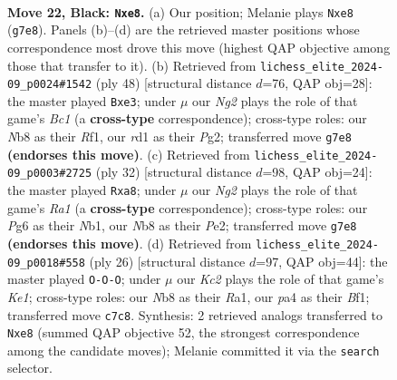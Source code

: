 \documentclass[11pt]{article}
\begin{document}
\clearpage

\begin{figure}[p]\centering
\begin{subfigure}{0.46\textwidth}\centering
\resizebox{\linewidth}{!}{%
\newchessgame
\chessboard[
  setfen={rn2Bbr1/1pk3np/4p1p1/p1P3B1/P3P3/2N5/1P3RPP/3RN1K1 b - - 0 22},
  showmover=false,
  pgfstyle=straightmove, color=movearrow, markmove={g7-e8}
]}
\caption{}
\end{subfigure}\hfill
\begin{subfigure}{0.46\textwidth}\centering
\resizebox{\linewidth}{!}{%
\newchessgame
\chessboard[
  setfen={4r3/p1pk2pp/8/3r1p1n/2p2p2/2P1bN1N/PP4PP/R1B2R1K w - - 6 25},
  showmover=false,
  pgfstyle=straightmove, color=movearrow, markmove={c1-e3}
]}
\caption{}
\end{subfigure}
\\[4pt]
\begin{subfigure}{0.46\textwidth}\centering
\resizebox{\linewidth}{!}{%
\newchessgame
\chessboard[
  setfen={q4rk1/1p3ppp/2n1bn2/8/1p1p4/3P1NPP/4PPB1/RN3RK1 w - - 0 17},
  showmover=false,
  pgfstyle=straightmove, color=movearrow, markmove={a1-a8}
]}
\caption{}
\end{subfigure}\hfill
\begin{subfigure}{0.46\textwidth}\centering
\resizebox{\linewidth}{!}{%
\newchessgame
\chessboard[
  setfen={r2r2k1/pp3p1p/2nNbp2/4p3/4P3/2P5/PP3PPP/R3KB1R w KQ - 1 14},
  showmover=false,
  pgfstyle=straightmove, color=movearrow, markmove={e1-c1}
]}
\caption{}
\end{subfigure}
\caption{\textbf{Move 22, Black: \texttt{Nxe8}.} (a) Our position; Melanie plays \texttt{Nxe8} (\texttt{g7e8}). Panels (b)--(d) are the retrieved master positions whose correspondence most drove this move (highest QAP objective among those that transfer to it). (b) Retrieved from \texttt{lichess\_elite\_2024-09\_p0024\#1542} (ply 48) [structural distance $d$=76, QAP obj=28]: the master played \texttt{Bxe3}; under $\mu$ our \emph{Ng2} plays the role of that game's \emph{Bc1} (a \textbf{cross-type} correspondence); cross-type roles: our \emph{N}b8 as their \emph{R}f1, our \emph{r}d1 as their \emph{P}g2; transferred move \texttt{g7e8} \textbf{(endorses this move)}. (c) Retrieved from \texttt{lichess\_elite\_2024-09\_p0003\#2725} (ply 32) [structural distance $d$=98, QAP obj=24]: the master played \texttt{Rxa8}; under $\mu$ our \emph{Ng2} plays the role of that game's \emph{Ra1} (a \textbf{cross-type} correspondence); cross-type roles: our \emph{P}g6 as their \emph{N}b1, our \emph{N}b8 as their \emph{P}e2; transferred move \texttt{g7e8} \textbf{(endorses this move)}. (d) Retrieved from \texttt{lichess\_elite\_2024-09\_p0018\#558} (ply 26) [structural distance $d$=97, QAP obj=44]: the master played \texttt{O-O-O}; under $\mu$ our \emph{Kc2} plays the role of that game's \emph{Ke1}; cross-type roles: our \emph{N}b8 as their \emph{R}a1, our \emph{p}a4 as their \emph{B}f1; transferred move \texttt{c7c8}. Synthesis: 2 retrieved analogs transferred to \texttt{Nxe8} (summed QAP objective 52, the strongest correspondence among the candidate moves); Melanie committed it via the \texttt{search} selector.}
\label{fig:thought-m43}
\end{figure}
\end{document}
